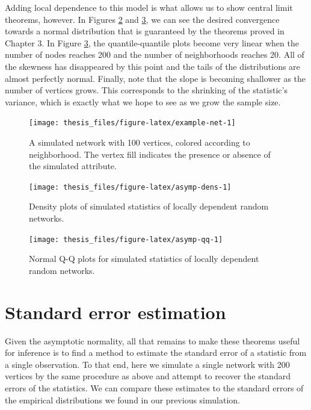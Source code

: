 \documentclass[12pt,twoside]{reedthesis}
\theoremstyle{definition}
\theoremstyle{definition}
\theoremstyle{remark}
\begin{document}
Adding local dependence to this model is what allows us to show central
limit theorems, however. In Figures \ref{fig:asymp-dens} and
\ref{fig:asymp-qq}, we can see the desired convergence towards a normal
distribution that is guaranteed by the theorems proved in Chapter 3. In
Figure \ref{fig:asymp-qq}, the quantile-quantile plots become very
linear when the number of nodes reaches 200 and the number of
neighborhoods reaches 20. All of the skewness has disappeared by this
point and the tails of the distributions are almost perfectly normal.
Finally, note that the slope is becoming shallower as the number of
vertices grows. This corresponds to the shrinking of the statistic's
variance, which is exactly what we hope to see as we grow the sample
size.
\begin{figure}

{\centering \texttt{[image: thesis\_files/figure-latex/example-net-1]} 

}

\caption{A simulated network with 100 vertices, colored according to neighborhood. The vertex fill indicates the presence or absence of the simulated attribute.}\label{fig:example-net}
\end{figure}
\begin{figure}

{\centering \texttt{[image: thesis\_files/figure-latex/asymp-dens-1]} 

}

\caption{Density plots of simulated statistics of locally dependent random networks.}\label{fig:asymp-dens}
\end{figure}
\begin{figure}

{\centering \texttt{[image: thesis\_files/figure-latex/asymp-qq-1]} 

}

\caption{Normal Q-Q plots for simulated statistics of locally dependent random networks.}\label{fig:asymp-qq}
\end{figure}
\section{Standard error estimation}\label{standard-error-estimation}

Given the asymptotic normality, all that remains to make these theorems
useful for inference is to find a method to estimate the standard error
of a statistic from a single observation. To that end, here we simulate
a single network with 200 vertices by the same procedure as above and
attempt to recover the standard errors of the statistics. We can compare
these estimates to the standard errors of the empirical distributions we
found in our previous simulation.
\end{document}
